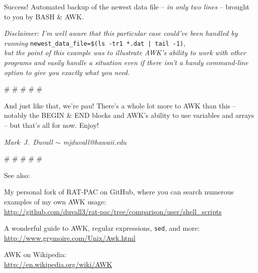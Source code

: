 \documentclass[10pt,a4]{article}
\begin{document}
\colorbox{black}{\color{white}{
run3.dat \qquad 100\% 273M 1.0MB/s 04:33
}}
\normalfont

Success! Automated backup of the newest data file -- \emph{in only two lines} -- brought to you by BASH \& AWK.

\scriptsize
\textit{Disclaimer: I'm well aware that this particular case could've been handled by running} \texttt{newest\_data\_file=\$(ls -tr1 *.dat | tail -1)},\\\textit{but the point of this example was to illustrate AWK's ability to work with other programs and easily handle a situation even if there isn't a handy command-line option to give you exactly what you need.}
\normalsize


\pagebreak


\# \# \# \# \#


And just like that, we're pau! There's a whole lot more to AWK than this -- notably the BEGIN \& END blocks and AWK's ability to use variables and arrays -- but that's all for now. Enjoy!


\emph{Mark~J.~Duvall $\sim$ mjduvall@hawaii.edu}


\# \# \# \# \#

See also:

My personal fork of RAT-PAC on GitHub, where you can search numerous examples of my own AWK usage:\\
\url{http://github.com/duvall3/rat-pac/tree/comparison/user/shell\_scripts}

A wonderful guide to AWK, regular expressions, \texttt{sed}, and more:\\
\url{http://www.grymoire.com/Unix/Awk.html}

AWK on Wikipedia:\\
\url{http://en.wikipedia.org/wiki/AWK}



\end{document}
